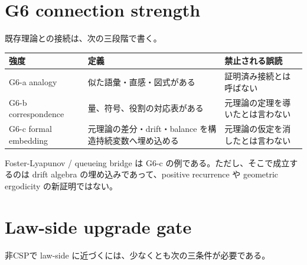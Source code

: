 \documentclass[12pt,a4paper]{article}
\begin{document}
\section{G6 connection strength}\label{g6-connection-strength}

既存理論との接続は、次の三段階で書く。

{\def\LTcaptype{table} %
\begin{longtable}[]{@{}
  >{\raggedright\arraybackslash}p{}
  >{\raggedright\arraybackslash}p{}
  >{\raggedright\arraybackslash}p{}@{}}
\toprule\noalign{}
\begin{minipage}[b]{\linewidth}\raggedright
強度
\end{minipage} & \begin{minipage}[b]{\linewidth}\raggedright
定義
\end{minipage} & \begin{minipage}[b]{\linewidth}\raggedright
禁止される誤読
\end{minipage} \\
\midrule\noalign{}
\endhead
\bottomrule\noalign{}
\endlastfoot
G6-a analogy & 似た語彙・直感・図式がある & 証明済み接続とは呼ばない \\
G6-b correspondence & 量、符号、役割の対応表がある & 元理論の定理を導いたとは言わない \\
G6-c formal embedding & 元理論の差分・drift・balance を構造持続変数へ埋め込める & 元理論の仮定を消したとは言わない \\
\end{longtable}
}

Foster-Lyapunov / queueing bridge は G6-c の例である。ただし、そこで成立するのは drift algebra の埋め込みであって、positive recurrence や geometric ergodicity の新証明ではない。

\section{Law-side upgrade gate}\label{law-side-upgrade-gate}

非CSPで law-side に近づくには、少なくとも次の三条件が必要である。
\end{document}
